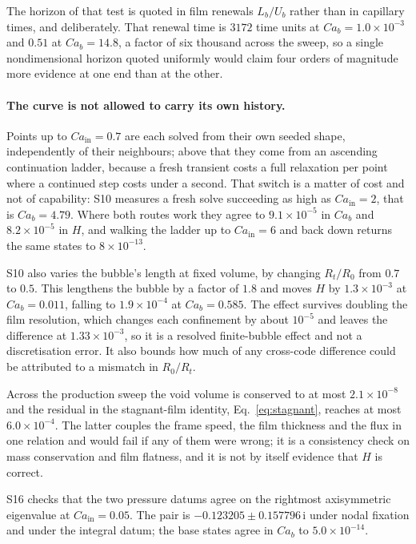 \documentclass[11pt,a4paper]{article}
\begin{document}
The horizon of that test is quoted in film renewals $L_b/U_b$ rather than in
capillary times, and deliberately. That renewal time is $3172$ time units at
$Ca_b=1.0\times10^{-3}$ and $0.51$ at $Ca_b=14.8$, a factor of six thousand
across the sweep, so a single nondimensional horizon quoted uniformly would
claim four orders of magnitude more evidence at one end than at the other.

\paragraph{The curve is not allowed to carry its own history.} Points up to
$Ca_{\mathrm{in}}=0.7$ are each solved from their own seeded shape,
independently of their neighbours; above that they come from an ascending
continuation ladder, because a fresh transient costs a full relaxation per
point where a continued step costs under a second. That switch is a matter of
cost and not of capability: S10 measures a fresh solve succeeding as high as
$Ca_{\mathrm{in}}=2$, that is $Ca_b=4.79$. Where both routes work they agree to
$9.1\times10^{-5}$ in $Ca_b$ and $8.2\times10^{-5}$ in $H$, and walking the
ladder up to $Ca_{\mathrm{in}}=6$ and back down returns the same states to
$8\times10^{-13}$.

S10 also varies the bubble's length at fixed volume, by changing $R_t/R_0$ from
$0.7$ to $0.5$. This lengthens the bubble by a factor of $1.8$ and moves $H$ by
$1.3\times10^{-3}$ at $Ca_b=0.011$, falling to $1.9\times10^{-4}$ at
$Ca_b=0.585$. The effect survives doubling the film resolution, which changes
each confinement by about $10^{-5}$ and leaves the difference at
$1.33\times10^{-3}$, so it is a resolved finite-bubble effect and not a
discretisation error. It also bounds how much of any cross-code difference
could be attributed to a mismatch in $R_0/R_t$.

Across the production sweep the void volume is conserved to at most
$2.1\times10^{-8}$ and the residual in the stagnant-film identity,
Eq.~\eqref{eq:stagnant}, reaches at most $6.0\times10^{-4}$. The latter couples
the frame speed, the film thickness and the flux in one relation and would fail
if any of them were wrong; it is a consistency check on mass conservation and
film flatness, and it is not by itself evidence that $H$ is correct.

S16 checks that the two pressure datums agree on the rightmost axisymmetric
eigenvalue at $Ca_{\mathrm{in}}=0.05$. The pair is
$-0.123205\pm0.157796\,\mathrm{i}$ under nodal fixation and under the
integral datum; the base states agree in $Ca_b$ to $5.0\times10^{-14}$.
\end{document}
